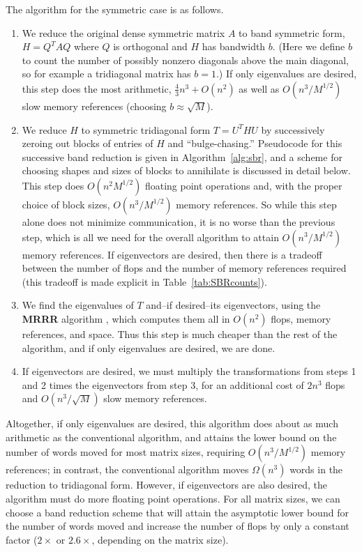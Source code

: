 \documentclass{article}
\theoremstyle{definition}
\begin{document}
The algorithm for the symmetric case is as follows.
\begin{enumerate}
\item We reduce the original dense symmetric matrix $A$ to band symmetric form, $H = Q^TAQ$ where $Q$ is orthogonal and $H$ has bandwidth $b$. (Here we define $b$ to count the number of possibly nonzero diagonals above the main diagonal, so for example a tridiagonal matrix has $b=1$.) If only eigenvalues are desired, this step does the most arithmetic, $\frac{4}{3}n^3 + O(n^2)$ as well as $O(n^3 / M^{1/2})$ slow memory references (choosing $b\approx\sqrt M$).
\item We reduce $H$ to symmetric tridiagonal form $T = U^THU$ by successively zeroing out blocks of entries of $H$ and ``bulge-chasing.''  Pseudocode for this successive band reduction is given in Algorithm~\ref{alg:sbr}, and a scheme for choosing shapes and sizes of blocks to annihilate is discussed in detail below. This step does $O(n^2 M^{1/2})$ floating point operations and, with the proper choice of block sizes, $O(n^3 / M^{1/2})$ memory references.  So while this step alone does not minimize communication, it is no worse than the previous step, which is all we need for the overall algorithm to attain $O(n^3 / M^{1/2})$ memory references.  If eigenvectors are desired, then there is a tradeoff between the number of flops and the number of memory references required (this tradeoff is made explicit in Table~\ref{tab:SBRcounts}).
\item We find the eigenvalues of $T$ and--if desired--its eigenvectors, using the \textbf{MRRR} algorithm \cite{DPV06}, which computes them all in $O(n^2)$ flops, memory references, and space. Thus this step is much cheaper than the rest of the algorithm, and if only eigenvalues are desired, we are done.
\item If eigenvectors are desired, we must multiply the transformations from steps 1 and 2 times the eigenvectors from step 3, for an additional cost of $2n^3$ flops and $O(n^3 / \sqrt{M})$ slow memory references. 
\end{enumerate}
Altogether, if only eigenvalues are desired, this algorithm does about as much arithmetic as the conventional algorithm, and attains the lower bound on the number of words moved for most matrix sizes, requiring $O(n^3/M^{1/2})$ memory references; in contrast, the conventional algorithm \cite{lapackmanual} moves $\Omega(n^3)$ words in the reduction to tridiagonal form. However, if eigenvectors are also desired, the algorithm must do more floating point operations.  For all matrix sizes, we can choose a band reduction scheme that will attain the asymptotic lower bound for the number of words moved and increase the number of flops by only a constant factor ($2\times$ or $2.6\times$, depending on the matrix size).
\end{document}
